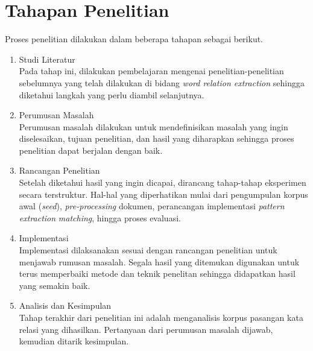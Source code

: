 
\section{Tahapan Penelitian}
Proses penelitian dilakukan dalam beberapa tahapan sebagai berikut.
\begin{enumerate}
	\item Studi Literatur \\
	Pada tahap ini, dilakukan pembelajaran mengenai penelitian-penelitian sebelumnya yang telah dilakukan di bidang \textit{word relation extraction} sehingga diketahui langkah yang perlu diambil selanjutnya.
	\item Perumusan Masalah \\
	Perumusan masalah dilakukan untuk mendefinisikan masalah yang ingin diselesaikan, tujuan penelitian, dan hasil yang diharapkan sehingga proses penelitian dapat berjalan dengan baik.
	\item Rancangan Penelitian \\
	Setelah diketahui hasil yang ingin dicapai, dirancang tahap-tahap eksperimen secara terstruktur. Hal-hal yang diperhatikan mulai dari pengumpulan korpus awal (\textit{seed}), \textit{pre-processing} dokumen, perancangan implementasi \textit{pattern extraction} \textit{matching}, hingga proses evaluasi.
	\item Implementasi \\
	Implementasi dilaksanakan sesuai dengan rancangan penelitian untuk menjawab rumusan masalah. Segala hasil yang ditemukan digunakan untuk terus memperbaiki metode dan teknik penelitan sehingga didapatkan hasil yang semakin baik.
	\item Analisis dan Kesimpulan \\
	Tahap terakhir dari penelitian ini adalah menganalisis korpus pasangan kata relasi yang dihasilkan. Pertanyaan dari perumusan masalah dijawab, kemudian ditarik kesimpulan.
	
\end{enumerate}


